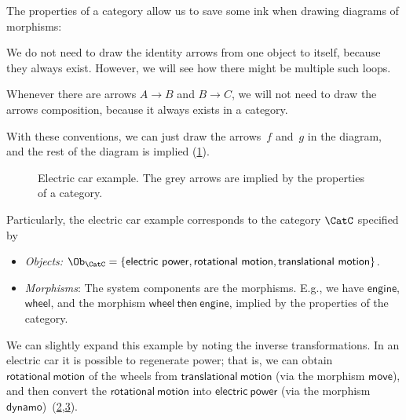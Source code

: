 \noindent The properties of a category allow us to save some ink when drawing diagrams of morphisms:
\begin{compactitem}
\item We do not need to draw the identity arrows from one object to itself, because they always exist. However, we will see how there might be multiple such loops.
\item  Whenever there are arrows $A\to B$ and $B \to C$, we will not need to draw the arrows composition, because it always exists in a category.
\end{compactitem}

With these conventions, we can just draw the arrows~$f$ and~$g$ in the diagram,
and the rest of the diagram is implied (\cref{fig:e5}).

\begin{figure}[h!]
    \centering
    \caption{\label{fig:e5} Electric car example. The grey arrows are implied by the properties
    of a category.}
\end{figure}

Particularly, the electric car example corresponds to the category $\CatC$ specified by 
\begin{itemize}
    \item \emph{Objects:} $\Ob_\CatC=\{\mathsf{electric}\ \mathsf{power},\mathsf{rotational}\ \mathsf{motion},\mathsf{translational}\ \mathsf{motion}\}$.
    \item \emph{Morphisms}: The system components are the morphisms. E.g., we have $\mathsf{engine}$, $\mathsf{wheel}$, and the morphism $\mathsf{wheel \ then \ engine}$, implied by the properties of the category.
\end{itemize}

We can slightly expand this example by noting the inverse transformations. In an electric car
it is possible to regenerate power; that is, we can obtain $\mathsf{rotational}\ \mathsf{motion}$ of the wheels from
$\mathsf{translational}\ \mathsf{motion}$ (via the morphism $\mathsf{move}$), and then convert the $\mathsf{rotational}\ \mathsf{motion}$ into $\mathsf{electric}\ \mathsf{power}$ (via the morphism $\mathsf{dynamo}$)~(\cref{fig:e6},\cref{fig:e6-together}).


\begin{figure}[h!]
    \centering
    \caption{\label{fig:e6}}
\end{figure}


\begin{figure}[h!]
    \centering
    \caption{\label{fig:e6-together}}
\end{figure}

